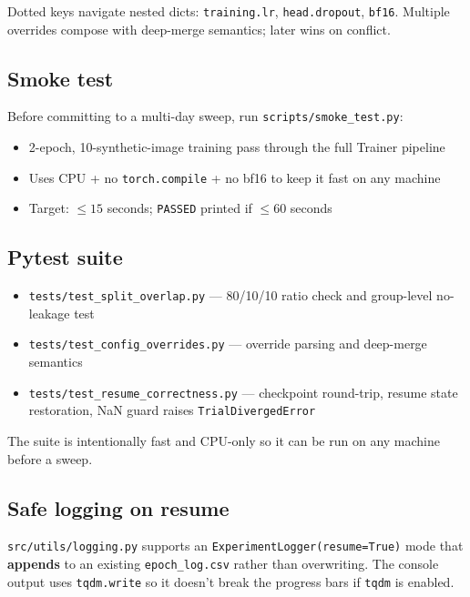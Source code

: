\documentclass[10pt,a4paper]{article}
\begin{document}
Dotted keys navigate nested dicts: \texttt{training.lr},
\texttt{head.dropout}, \texttt{bf16}. Multiple overrides compose with
deep-merge semantics; later wins on conflict.

\subsection{Smoke test}

Before committing to a multi-day sweep, run
\texttt{scripts/smoke\_test.py}:

\begin{itemize}[leftmargin=*]
  \item 2-epoch, 10-synthetic-image training pass through the full
        Trainer pipeline
  \item Uses CPU + no \texttt{torch.compile} + no bf16 to keep it fast
        on any machine
  \item Target: $\le 15$ seconds; \texttt{PASSED} printed if $\le 60$
        seconds
\end{itemize}

\subsection{Pytest suite}

\begin{itemize}[leftmargin=*]
  \item \texttt{tests/test\_split\_overlap.py} — 80/10/10 ratio check
        and group-level no-leakage test
  \item \texttt{tests/test\_config\_overrides.py} — override parsing
        and deep-merge semantics
  \item \texttt{tests/test\_resume\_correctness.py} — checkpoint
        round-trip, resume state restoration, NaN guard raises
        \texttt{TrialDivergedError}
\end{itemize}

The suite is intentionally fast and CPU-only so it can be run on any
machine before a sweep.

\subsection{Safe logging on resume}

\texttt{src/utils/logging.py} supports an
\texttt{ExperimentLogger(resume=True)} mode that \textbf{appends} to
an existing \texttt{epoch\_log.csv} rather than overwriting. The
console output uses \texttt{tqdm.write} so it doesn't break the
progress bars if \texttt{tqdm} is enabled.
\end{document}
